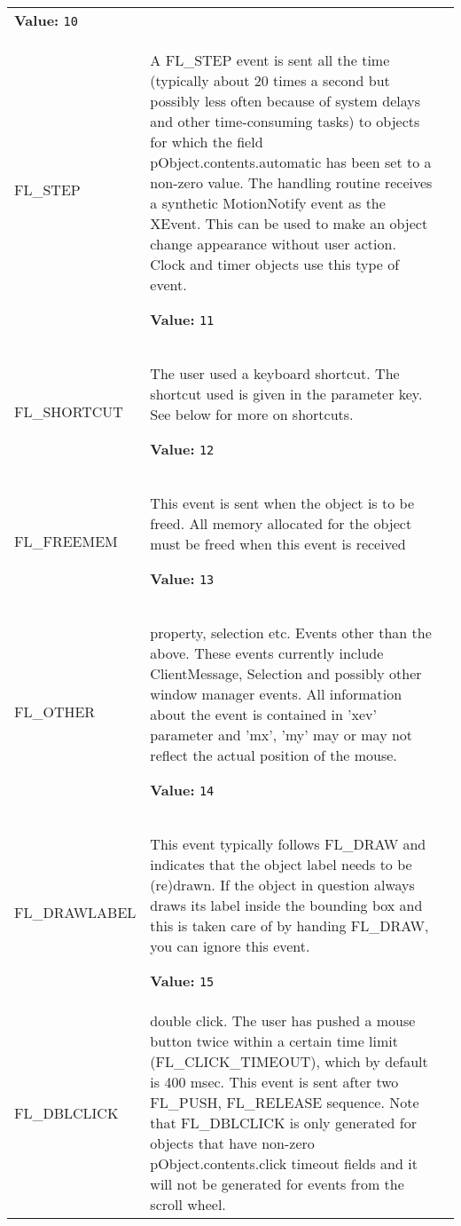 \begin{longtable}{|p{\varnamewidth}|p{\vardescrwidth}|l}
\textbf{Value:} 
{\tt 10}&\\
\cline{1-2}
\raggedright F\-L\-\_\-S\-T\-E\-P\- & \raggedright A FL\_STEP event is sent all the time (typically about 20 times a second
but possibly less often because of system delays and other time-consuming
tasks) to objects for which the field pObject.contents.automatic has been
set to a non-zero value. The handling routine receives a synthetic
MotionNotify event as the XEvent. This can be used to make an object change
appearance without user action. Clock and timer objects use this type of
event.

\textbf{Value:} 
{\tt 11}&\\
\cline{1-2}
\raggedright F\-L\-\_\-S\-H\-O\-R\-T\-C\-U\-T\- & \raggedright The user used a keyboard shortcut. The shortcut used is given in the
parameter key. See below for more on shortcuts.

\textbf{Value:} 
{\tt 12}&\\
\cline{1-2}
\raggedright F\-L\-\_\-F\-R\-E\-E\-M\-E\-M\- & \raggedright This event is sent when the object is to be freed. All memory
allocated for the object must be freed when this event is received

\textbf{Value:} 
{\tt 13}&\\
\cline{1-2}
\raggedright F\-L\-\_\-O\-T\-H\-E\-R\- & \raggedright property, selection etc. Events other than the above. These events
currently include ClientMessage, Selection and possibly other window manager
events. All information about the event is contained in 'xev' parameter and
'mx', 'my' may or may not reflect the actual position of the mouse.

\textbf{Value:} 
{\tt 14}&\\
\cline{1-2}
\raggedright F\-L\-\_\-D\-R\-A\-W\-L\-A\-B\-E\-L\- & \raggedright This event typically follows FL\_DRAW and indicates that the object label
needs to be (re)drawn. If the object in question always draws its label
inside the bounding box and this is taken care of by handing FL\_DRAW, you
can ignore this event.

\textbf{Value:} 
{\tt 15}&\\
\cline{1-2}
\raggedright F\-L\-\_\-D\-B\-L\-C\-L\-I\-C\-K\- & \raggedright double click. The user has pushed a mouse button twice within a certain
time limit (FL\_CLICK\_TIMEOUT), which by default is 400 msec. This event is
sent after two FL\_PUSH, FL\_RELEASE sequence. Note that FL\_DBLCLICK is only
generated for objects that have non-zero pObject.contents.click timeout
fields and it will not be generated for events from the scroll wheel.


\end{longtable}
